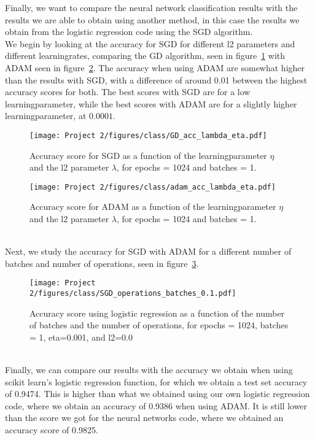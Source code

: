 \documentclass[english,notitlepage,reprint,nofootinbib]{revtex4-2}  %
\begin{document}
Finally, we want to compare the neural network classification results with the results we are able to obtain using another method, in this case the results we obtain from the logistic regression code using the SGD algorithm. 
\vspace{3mm}
\\ 
We begin by looking at the accuracy for SGD for different l2 parameters and different learningrates, comparing the GD algorithm, seen in figure~\ref{fig: gd_lambda_eta} with ADAM seen in figure~\ref{fig: adam_lambda_eta}. The accuracy when using ADAM are somewhat higher than the results with SGD, with a difference of around 0.01 between the highest accuracy scores for both. The best scores with SGD are for a low learningparameter, while the best scores with ADAM are for a slightly higher learningparameter, at $0.0001$. 
\begin{figure}[h!]
    \centering %
    \texttt{[image: Project 2/figures/class/GD\_acc\_lambda\_eta.pdf]} 
    \caption{Accuracy score for SGD as a function of the learningparameter $\eta$ and the l2 parameter $\lambda$, for epochs = 1024 and batches = 1.}
    \label{fig: gd_lambda_eta}
\end{figure}
\begin{figure}[h!]
    \centering %
    \texttt{[image: Project 2/figures/class/adam\_acc\_lambda\_eta.pdf]} 
    \caption{Accuracy score for ADAM as a function of the learningparameter $\eta$ and the l2 parameter $\lambda$, for epochs = 1024 and batches = 1.}
    \label{fig: adam_lambda_eta}
\end{figure}
\vspace{3mm}
\\ 
Next, we study the accuracy for SGD with ADAM for a different number of batches and number of operations, seen in figure~\ref{fig: op_batch}. 
\begin{figure}[h!]
    \centering %
    \texttt{[image: Project 2/figures/class/SGD\_operations\_batches\_0.1.pdf]} 
    \caption{Accuracy score using logistic regression as a function of the number of batches and the number of operations, for epochs = 1024, batches = 1, eta=0.001, and l2=0.0}
    \label{fig: op_batch}
\end{figure}
\vspace{3mm}
\\ 
Finally, we can compare our results with the accuracy we obtain when using scikit learn's logistic regression function, for which we obtain a test set accuracy of 0.9474. This is higher than what we obtained using our own logistic regression code, where we obtain an accuracy of 0.9386 when using ADAM. It is still lower than the score we got for the neural networks code, where we obtained an accuracy score of 0.9825. 
    
\end{document}
